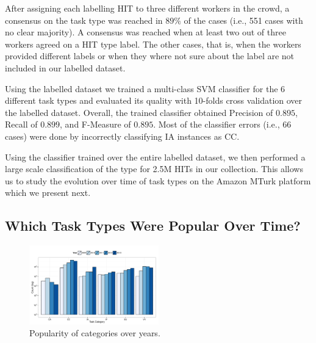 After assigning each labelling HIT to three different workers in the crowd, a consensus on the task type was reached in $89\%$ of the cases (i.e., 551 cases with no clear majority). A consensus was reached when at least two out of three workers agreed on a HIT type label. The other cases, that is, when the workers provided different labels or when they where not sure about the label are not included in our labelled dataset.

Using the labelled dataset we trained a multi-class SVM classifier for the 6 different task types and evaluated its quality with 10-folds cross validation over the labelled dataset. Overall, the trained classifier obtained Precision of $0.895$, Recall of $0.899$, and F-Measure of $0.895$. Most of the classifier errors (i.e., 66 cases) were done by incorrectly classifying IA instances as CC.

Using the classifier trained over the entire labelled dataset, we then performed a large scale classification of the type for 2.5M HITs in our collection. This allows us to study the evolution over time of task types on the Amazon MTurk platform which we present next.

\subsection{Which Task Types Were Popular Over Time?}

\begin{figure}[htbp]
	\centering
		\includegraphics[width=0.5\textwidth]{figures/category_trends}
	\caption{Popularity of categories over years.}
	\label{fig:cat_trends}
\end{figure}


